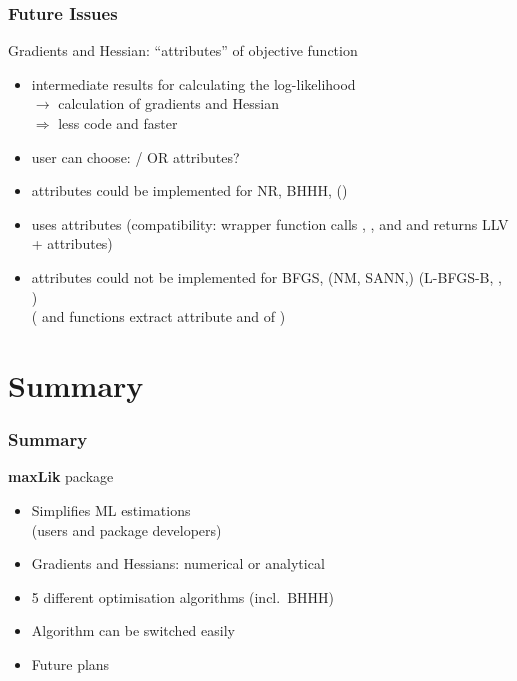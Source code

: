 \documentclass{beamer}
\begin{document}
\begin{frame}
\frametitle{Future Issues}
Gradients and Hessian: ``attributes'' of objective function
\begin{itemize}
\item intermediate results for calculating the log-likelihood\\
   $\rightarrow$ calculation of gradients and Hessian\\
   $\Rightarrow$ less code and faster
\item user can choose: / OR attributes?
\item attributes could be implemented for NR, BHHH, ()
\item {} uses attributes
   (compatibility: wrapper function calls , ,
   and  and returns LLV + attributes)
\item attributes could not be implemented for BFGS, (NM, SANN,)
   (L-BFGS-B, , )\\
   ( and  functions
   extract attribute  and 
   of )
\end{itemize}
\end{frame}


\section{Summary}
\begin{frame}
\frametitle{Summary}
\textbf{maxLik} package
\begin{itemize}
\item Simplifies ML estimations\\
   (users and package developers)
\item Gradients and Hessians: numerical or analytical
\item 5 different optimisation algorithms (incl.~BHHH)
\item Algorithm can be switched easily
\item Future plans
\end{itemize}
\end{frame}
\end{document}
